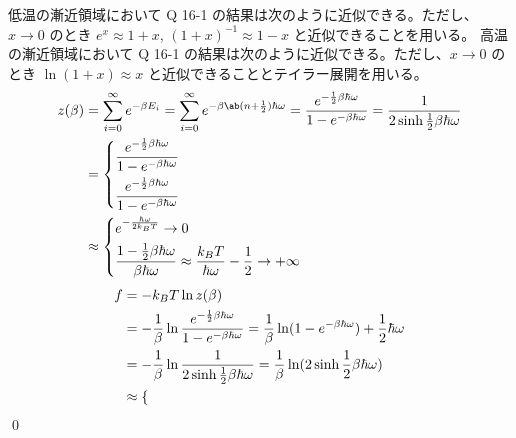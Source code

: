 \documentclass[uplatex,diffipdfmx,a4paper,11pt]{jlreq}
\makeatletter
\numberwithin{equation}{section}
\theoremstyle{definition}
\renewenvironment{proof}[1][\proofname]{\par
  \normalfont
  \topsep6\p@\@plus6\p@ \trivlist
  \item[\hskip\labelsep{\bfseries #1}\@addpunct{\bfseries}]\ignorespaces\quad\par
}{%
  \qed\endtrivlist\@endpefalse
}
\renewcommand\proofname{証明}
\makeatother
\begin{document}
\begin{proof}
  低温の漸近領域において Q 16-1 の結果は次のように近似できる。ただし、$x\to 0$ のとき $e^x \approx 1 + x$, $(1 + x)^{-1} \approx 1 - x$ と近似できることを用いる。
  高温の漸近領域において Q 16-1 の結果は次のように近似できる。ただし、$x\to 0$ のとき $\ln(1 + x) \approx x$ と近似できることとテイラー展開を用いる。
  \begin{align}
    z(\beta) & = \sum_{i = 0}^{\infty}e^{-\beta E_i} = \sum_{i = 0}^{\infty}e^{-\beta\ab(n + \frac{1}{2})\hbar\omega} = \frac{e^{-\frac{1}{2}\beta\hbar\omega}}{1 - e^{-\beta\hbar\omega}} = \frac{1}{2\sinh \frac{1}{2}\beta\hbar\omega} \\
             & = \begin{dcases}
                   \frac{e^{-\frac{1}{2}\beta\hbar\omega}}{1 - e^{-\beta\hbar\omega}} \\
                   \frac{e^{-\frac{1}{2}\beta\hbar\omega}}{1 - e^{-\beta\hbar\omega}} \\
                 \end{dcases}                                                                                                                                                \\
             & \approx \begin{dcases}
                         e^{-\frac{\hbar\omega}{2k_BT}} \to 0                                                                                \\
                         \frac{1 - \frac{1}{2}\beta\hbar\omega}{\beta\hbar\omega} \approx \frac{k_BT}{\hbar\omega} - \frac{1}{2} \to +\infty \\
                       \end{dcases}
  \end{align}
  \begin{align}
    f & = -k_BT\ln z(\beta)                                                                                                                                               \\
      & = -\frac{1}{\beta}\ln \frac{e^{-\frac{1}{2}\beta\hbar\omega}}{1 - e^{-\beta\hbar\omega}} = \frac{1}{\beta}\ln(1 - e^{-\beta\hbar\omega}) + \frac{1}{2}\hbar\omega \\
      & = -\frac{1}{\beta}\ln \frac{1}{2\sinh \frac{1}{2}\beta\hbar\omega} = \frac{1}{\beta}\ln(2\sinh \frac{1}{2}\beta\hbar\omega)                                       \\
      & \approx \begin{dcases}

\end{dcases}
\end{align}
\end{proof}
\end{document}
